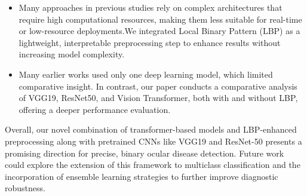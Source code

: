 \documentclass{ijclclp}
\begin{document}
\begin{itemize}
    \item Many approaches in previous studies rely on complex architectures that require high computational resources, making them less suitable for real-time or low-resource deployments.We integrated Local Binary Pattern (LBP) as a lightweight, interpretable preprocessing step to enhance results without increasing model complexity.

    \item Many earlier works used only one deep learning model, which limited comparative insight. In contrast, our paper conducts a comparative analysis of VGG19, ResNet50, and Vision Transformer, both with and without LBP, offering a deeper performance evaluation.


  

   
\end{itemize}
Overall, our novel combination of transformer-based models and LBP-enhanced preprocessing along with pretrained CNNs like VGG19 and ResNet-50 presents a promising direction for precise, binary ocular disease detection. Future work could explore the extension of this framework to multiclass classification and the incorporation of ensemble learning strategies to further improve diagnostic robustness.
\clearpage
\end{document}

